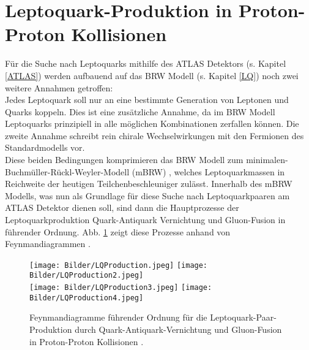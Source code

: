 \section{Leptoquark-Produktion in Proton-Proton Kollisionen}\label{LQpp}%
Für die Suche nach Leptoquarks mithilfe des ATLAS Detektors (s. Kapitel \ref{ATLAS}) werden aufbauend auf das BRW Modell (s. Kapitel \ref{LQ}) noch zwei weitere Annahmen getroffen:\\
Jedes Leptoquark soll nur an eine bestimmte Generation von Leptonen und Quarks koppeln. Dies ist eine zusätzliche Annahme, da im BRW Modell Leptoquarks prinzipiell in alle möglichen Kombinationen zerfallen können. Die zweite Annahme schreibt rein chirale Wechselwirkungen mit den Fermionen des Standardmodells vor.\\
Diese beiden Bedingungen komprimieren das BRW Modell zum minimalen-Buchmüller-Rückl-Weyler-Modell (mBRW) \cite{Kuze}, welches Leptoquarkmassen in Reichweite der heutigen Teilchenbeschleuniger zulässt. %
Innerhalb des mBRW Modells, was nun als Grundlage für diese Suche nach Leptoquarkpaaren am ATLAS Detektor dienen soll, sind dann die Hauptprozesse der Leptoquarkproduktion Quark-Antiquark Vernichtung und Gluon-Fusion in führender Ordnung. Abb. \ref{LQProduction} zeigt diese Prozesse anhand von Feynmandiagrammen \cite{LQATLAS}.   
\begin{figure}[htbp]                                 
  \begin{center}                                       
  \texttt{[image: Bilder/LQProduction.jpeg]} 
  \texttt{[image: Bilder/LQProduction2.jpeg]}\\ 
  \texttt{[image: Bilder/LQProduction3.jpeg]}
  \texttt{[image: Bilder/LQProduction4.jpeg]}
   \caption[Feynmandiagramme führender Ordnung für die Leptoquark-Paar-Produktion durch Quark-Antiquark-Vernichtung und Gluon-Fusion in Proton-Proton Kollisionen]{Feynmandiagramme führender Ordnung für die Leptoquark-Paar-Produktion durch Quark-Antiquark-Vernichtung und Gluon-Fusion in Proton-Proton Kollisionen \cite{LQATLAS}.}
   \label{LQProduction}                                     
   \end{center}
\end{figure}
